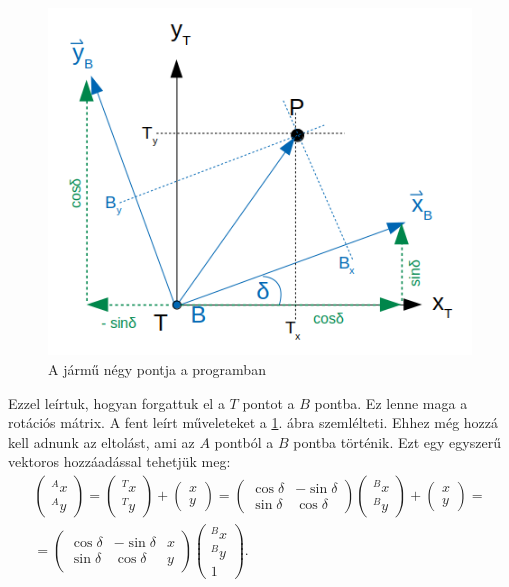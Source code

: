 \begin{figure}[h!]
\centering
\includegraphics[scale=0.70]{images/T_to_B_point.png}
\caption{A jármű négy pontja a programban}
\label{fig:t_to_b_point}
\end{figure}

Ezzel leírtuk, hogyan forgattuk el a $T$ pontot a $B$ pontba. Ez lenne maga a rotációs mátrix. A fent leírt műveleteket a \ref{fig:t_to_b_point}. ábra szemlélteti.
Ehhez még hozzá kell adnunk az eltolást, ami az $A$ pontból a $B$ pontba történik. Ezt egy egyszerű vektoros hozzáadással tehetjük meg:
\begin{gather*}
\begin{pmatrix}
{}^{A}x\\
{}^{A}y
\end{pmatrix}
=
\begin{pmatrix}
{}^{T}x\\
{}^{T}y
\end{pmatrix}
+
\begin{pmatrix}
x\\
y
\end{pmatrix}
=
\begin{pmatrix}
\cos\delta & -\sin\delta\\
\sin\delta & \cos\delta
\end{pmatrix}
\begin{pmatrix}
{}^{B}x\\
{}^{B}y
\end{pmatrix}
+
\begin{pmatrix}
x\\
y
\end{pmatrix}
= \\
=
\begin{pmatrix}
\cos\delta & -\sin\delta & x\\
\sin\delta & \cos\delta & y
\end{pmatrix}
\begin{pmatrix}
{}^{B}x\\
{}^{B}y\\
1
\end{pmatrix}.
\end{gather*}

